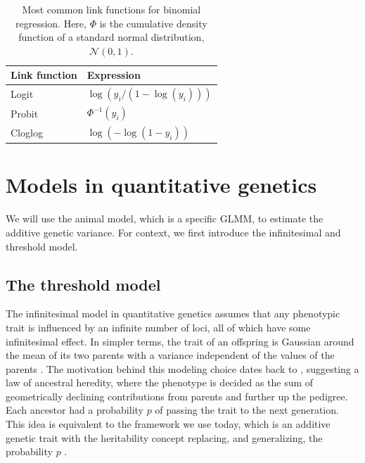 \begin{table}
    \centering
    \begin{tabular}{ll}
    Link function     & Expression  \\ \midrule
    Logit   & $\log(y_i/(1-\log(y_i)))$ \\
    Probit  & $\Phi^{-1}(y_i)$ \\
    Cloglog & $\log(-\log(1-y_i))$
    \end{tabular}
    \caption[Link functions for binomial regression]{Most common link functions for binomial regression. Here, $\Phi$ is the cumulative density function of a standard normal distribution, $\mathcal N(0,1)$.}
    \label{tab:link functions}
\end{table}

\section{Models in quantitative genetics} 
\label{sec:theory:qg models}
We will use the animal model, which is a specific GLMM, to estimate the additive genetic variance. For context, we first introduce the infinitesimal and threshold model.

\subsection{The threshold model}
\label{sec:theory:threshold model}
The infinitesimal model in quantitative genetics assumes that any phenotypic trait is influenced by an infinite number of loci, all of which have some infinitesimal effect. In simpler terms, the trait of an offspring is Gaussian around the mean of its two parents with a variance independent of the values of the parents \autocite{barton2017}. The motivation behind this modeling choice dates back to \textcite{galton1886}, suggesting a law of ancestral heredity, where the phenotype is decided as the sum of geometrically declining contributions from parents and further up the pedigree. Each ancestor had a probability $p$ of passing the trait to the next generation. This idea is equivalent to the framework we use today, which is an additive genetic trait with the heritability concept replacing, and generalizing, the probability $p$ \autocite{bulmer1998}.

